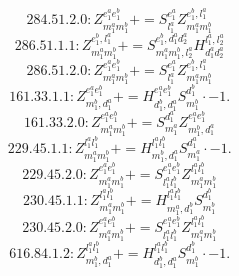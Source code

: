 \documentclass[letterpaper,10pt,fleqn,leqno,onecolumn]{article}
\begin{document}
\begin{equation} \;\;\;\;\;\;  284.51.2.0: Z^{e_{1}^{a}e_{1}^{b}}_{m_{1}^{a}m_{1}^{b}}+=S^{e_{1}^{a}}_{l_{1}^{a}}Z^{e_{1}^{b},l_{1}^{a}}_{m_{1}^{a}m_{1}^{b}} \end{equation}
\begin{equation} \;\;\;\;\;\;  286.51.1.1: Z^{e_{1}^{b},l_{1}^{a}}_{m_{1}^{a}m_{1}^{b}}+=S^{e_{1}^{b},d_{1}^{a}d_{2}^{a}}_{m_{1}^{a}m_{1}^{b},l_{2}^{a}}H^{l_{1}^{a},l_{2}^{a}}_{d_{1}^{a}d_{2}^{a}} \end{equation}
\begin{equation} \;\;\;\;\;\;  286.51.2.0: Z^{e_{1}^{a}e_{1}^{b}}_{m_{1}^{a}m_{1}^{b}}+=S^{e_{1}^{a}}_{l_{1}^{a}}Z^{e_{1}^{b},l_{1}^{a}}_{m_{1}^{a}m_{1}^{b}} \end{equation}
\begin{equation} \;\;\;\;\;\;  161.33.1.1: Z^{e_{1}^{a}e_{1}^{b}}_{m_{1}^{b},d_{1}^{a}}+=H^{e_{1}^{a}e_{1}^{b}}_{d_{1}^{b},d_{1}^{a}}S^{d_{1}^{b}}_{m_{1}^{b}}\cdot -1. \end{equation}
\begin{equation} \;\;\;\;\;\;  161.33.2.0: Z^{e_{1}^{a}e_{1}^{b}}_{m_{1}^{a}m_{1}^{b}}+=S^{d_{1}^{a}}_{m_{1}^{a}}Z^{e_{1}^{a}e_{1}^{b}}_{m_{1}^{b},d_{1}^{a}} \end{equation}
\begin{equation} \;\;\;\;\;\;  229.45.1.1: Z^{l_{1}^{a}l_{1}^{b}}_{m_{1}^{a}m_{1}^{b}}+=H^{l_{1}^{a}l_{1}^{b}}_{m_{1}^{b},d_{1}^{a}}S^{d_{1}^{a}}_{m_{1}^{a}}\cdot -1. \end{equation}
\begin{equation} \;\;\;\;\;\;  229.45.2.0: Z^{e_{1}^{a}e_{1}^{b}}_{m_{1}^{a}m_{1}^{b}}+=S^{e_{1}^{a}e_{1}^{b}}_{l_{1}^{a}l_{1}^{b}}Z^{l_{1}^{a}l_{1}^{b}}_{m_{1}^{a}m_{1}^{b}} \end{equation}
\begin{equation} \;\;\;\;\;\;  230.45.1.1: Z^{l_{1}^{a}l_{1}^{b}}_{m_{1}^{a}m_{1}^{b}}+=H^{l_{1}^{a}l_{1}^{b}}_{m_{1}^{a},d_{1}^{b}}S^{d_{1}^{b}}_{m_{1}^{b}} \end{equation}
\begin{equation} \;\;\;\;\;\;  230.45.2.0: Z^{e_{1}^{a}e_{1}^{b}}_{m_{1}^{a}m_{1}^{b}}+=S^{e_{1}^{a}e_{1}^{b}}_{l_{1}^{a}l_{1}^{b}}Z^{l_{1}^{a}l_{1}^{b}}_{m_{1}^{a}m_{1}^{b}} \end{equation}
\begin{equation} \;\;\;\;\;\;  616.84.1.2: Z^{l_{1}^{a}l_{1}^{b}}_{m_{1}^{b},d_{1}^{a}}+=H^{l_{1}^{a}l_{1}^{b}}_{d_{1}^{b},d_{1}^{a}}S^{d_{1}^{b}}_{m_{1}^{b}}\cdot -1. \end{equation}
\end{document}
